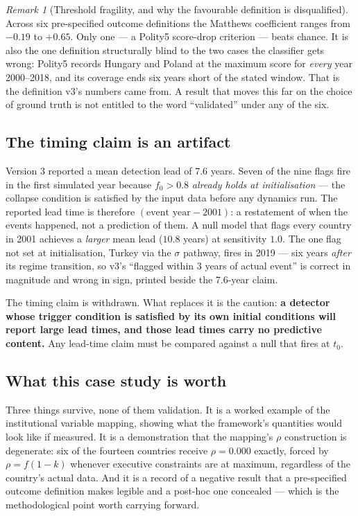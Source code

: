 \documentclass[11pt,a4paper]{article}
\theoremstyle{definition}
\theoremstyle{remark}
\newtheorem{remark}{Remark}[section]
\begin{document}
\begin{remark}[Threshold fragility, and why the favourable definition is disqualified]
Across six pre-specified outcome definitions the Matthews coefficient ranges from $-0.19$ to
$+0.65$. Only one --- a Polity5 score-drop criterion --- beats chance. It is also the one
definition structurally blind to the two cases the classifier gets wrong: Polity5 records
Hungary and Poland at the maximum score for \emph{every} year 2000--2018, and its coverage ends
six years short of the stated window. That is the definition v3's numbers came from. A result
that moves this far on the choice of ground truth is not entitled to the word ``validated'' under
any of the six.
\end{remark}

\subsection{The timing claim is an artifact}

Version 3 reported a mean detection lead of 7.6 years. Seven of the nine flags fire in the first
simulated year because $f_0 > 0.8$ \emph{already holds at initialisation} --- the collapse
condition is satisfied by the input data before any dynamics run. The reported lead time is
therefore $(\text{event year} - 2001)$: a restatement of when the events happened, not a
prediction of them. A null model that flags every country in 2001 achieves a \emph{larger} mean
lead ($10.8$ years) at sensitivity $1.0$. The one flag not set at initialisation, Turkey via the
$\sigma$ pathway, fires in 2019 --- six years \emph{after} its regime transition, so v3's
``flagged within 3 years of actual event'' is correct in magnitude and wrong in sign, printed
beside the 7.6-year claim.

The timing claim is withdrawn. What replaces it is the caution: \textbf{a detector whose trigger
condition is satisfied by its own initial conditions will report large lead times, and those lead
times carry no predictive content.} Any lead-time claim must be compared against a null that
fires at $t_0$.

\subsection{What this case study is worth}

Three things survive, none of them validation. It is a worked example of the institutional
variable mapping, showing what the framework's quantities would look like if measured. It is a
demonstration that the mapping's $\rho$ construction is degenerate: six of the fourteen countries
receive $\rho = 0.000$ exactly, forced by $\rho = f(1-k)$ whenever executive constraints are at
maximum, regardless of the country's actual data. And it is a record of a negative result that a
pre-specified outcome definition makes legible and a post-hoc one concealed --- which is the
methodological point worth carrying forward.
\end{document}
